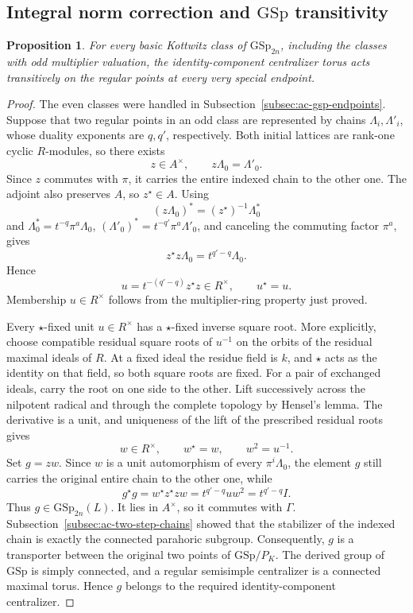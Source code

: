 \documentclass[11pt,a4paper]{article}
\newtheorem{proposition}[theorem]{Proposition}
\theoremstyle{definition}
\theoremstyle{remark}
\begin{document}
\subsection{Integral norm correction and \(\mathrm{GSp}\) transitivity}

\begin{proposition}\label{prop:ac-gsp-transitivity}
For every basic Kottwitz class of \(\mathrm{GSp}_{2n}\), including the
classes with odd multiplier valuation, the identity-component
centralizer torus acts transitively on the regular points at every very
special endpoint.
\end{proposition}

\begin{proof}
The even classes were handled in
Subsection~\ref{subsec:ac-gsp-endpoints}. Suppose that two regular points
in an odd class are represented by chains \(\Lambda_i,\Lambda'_i\),
whose duality exponents are \(q,q'\), respectively. Both initial
lattices are rank-one cyclic \(R\)-modules, so there exists
\[
z\in A^\times,\qquad z\Lambda_0=\Lambda'_0.
\]
Since \(z\) commutes with \(\pi\), it carries the entire indexed chain
to the other one. The adjoint also preserves \(A\), so \(z^\star\in A\).
Using
\[
(z\Lambda_0)^*=(z^\star)^{-1}\Lambda_0^*
\]
and
\(\Lambda_0^*=t^{-q}\pi^a\Lambda_0\),
\((\Lambda'_0)^*=t^{-q'}\pi^a\Lambda'_0\), and canceling the commuting
factor \(\pi^a\), gives
\[
z^\star z\Lambda_0=t^{q'-q}\Lambda_0.
\]
Hence
\[
u=t^{-(q'-q)}z^\star z\in R^\times,\qquad u^\star=u.
\]
Membership \(u\in R^\times\) follows from the multiplier-ring property
just proved.

Every \(\star\)-fixed unit \(u\in R^\times\) has a
\(\star\)-fixed inverse square root. More explicitly, choose compatible
residual square roots of \(u^{-1}\) on the orbits of the residual maximal
ideals of \(R\). At a fixed ideal the residue field is \(k\), and
\(\star\) acts as the identity on that field, so both square roots are
fixed. For a pair of exchanged ideals, carry the root on one side to
the other. Lift successively across the nilpotent radical and through
the complete topology by Hensel's lemma. The derivative is a unit, and
uniqueness of the lift of the prescribed residual roots gives
\[
w\in R^\times,\qquad w^\star=w,\qquad w^2=u^{-1}.
\]
Set \(g=zw\). Since \(w\) is a unit automorphism of every
\(\pi^i\Lambda_0\), the element \(g\) still carries the original entire
chain to the other one, while
\[
g^\star g
=w^\star z^\star zw
=t^{q'-q}u w^2
=t^{q'-q}I.
\]
Thus \(g\in\mathrm{GSp}_{2n}(L)\). It lies in \(A^\times\), so it
commutes with \(\Gamma\).
Subsection~\ref{subsec:ac-two-step-chains} showed that the stabilizer of
the indexed chain is exactly the connected parahoric subgroup.
Consequently, \(g\) is a transporter between the original two points
of \(\mathrm{GSp}/P_K\). The derived group of \(\mathrm{GSp}\) is simply
connected, and a regular semisimple centralizer is a connected maximal
torus. Hence \(g\) belongs to the required identity-component
centralizer.
\end{proof}
\end{document}
